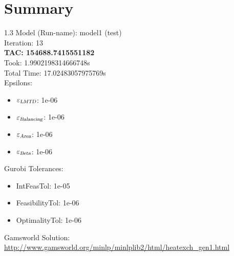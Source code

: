\documentclass{article}%
\begin{document}
%
\normalsize%
\section{Summary}%
\thispagestyle{plain}%
\begin{spacing}{1.3}%
\Large%
Model (Run-name): model1 (test)\\%
Iteration: 13\\%
\textbf{TAC: 154688.7415551182}\\%
Took: 1.9902198314666748s\\%
Total Time: 17.02483057975769s\\%
Epsilons:%
\begin{itemize}%
	\item $\varepsilon_{\textsl{LMTD}}$: 1e-06%
	\item $\varepsilon_{\textsl{Balancing}}$: 1e-06%
	\item $\varepsilon_{\textsl{Area}}$: 1e-06%
	\item $\varepsilon_{\textsl{Beta}}$: 1e-06%
\end{itemize}%
Gurobi Tolerances:%
\begin{itemize}%
	\item IntFeasTol: 1e-05%
	\item FeasibilityTol: 1e-06%
	\item OptimalityTol: 1e-06%
\end{itemize}%
\end{spacing}%
\normalsize%
Gamsworld Solution: \url{http://www.gamsworld.org/minlp/minlplib2/html/heatexch_gen1.html}%
%
\clearpage%
\end{document}
